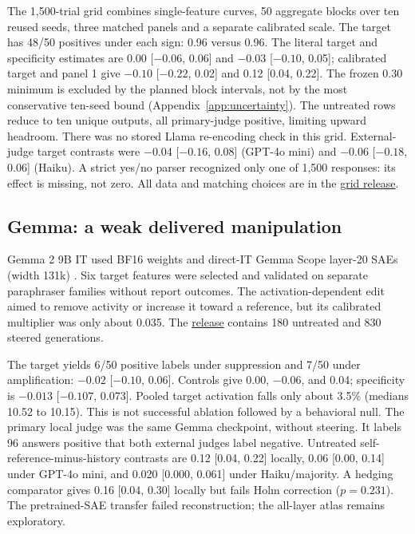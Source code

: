 \documentclass[11pt]{article}
\newcommand{\artifacttree}[2]{\href{https://github.com/tdj28/llm_selfref_pre/tree/f5e906e1737bc71bf20b642af1d698018eec82fe/#1}{#2}}
\begin{document}
The 1,500-trial grid combines single-feature curves, 50 aggregate blocks
over ten reused seeds, three matched panels and a separate calibrated scale.
The target has 48/50 positives under each sign: 0.96 versus 0.96.
The literal target and specificity estimates are 0.00 [$-0.06$, 0.06]
and $-0.03$ [$-0.10$, 0.05]; calibrated target and panel 1 give
$-0.10$ [$-0.22$, 0.02] and 0.12 [0.04, 0.22].
The frozen 0.30 minimum is excluded by the planned block intervals, not
by the most conservative ten-seed bound
(Appendix~\ref{app:uncertainty}). The untreated rows reduce to ten unique
outputs, all primary-judge positive, limiting upward headroom.
There was no stored Llama re-encoding check in this grid.
External-judge target contrasts were $-0.04$ [$-0.16$, 0.08]
(GPT-4o mini) and $-0.06$ [$-0.18$, 0.06] (Haiku).
A strict yes/no parser recognized only one of 1,500 responses: its effect
is missing, not zero. All data and matching choices are in the
\artifacttree{data/public_sae_consciousness_gating/confirmatory_v1_20260710/}{grid release}.

\subsection{Gemma: a weak delivered manipulation}
\label{sec:gemma}
Gemma 2 9B IT used BF16 weights and direct-IT Gemma Scope layer-20
SAEs (width 131k) \citep{lieberum2024gemmascope}.
Six target features were selected and validated on separate paraphraser
families without report outcomes. The activation-dependent edit aimed to
remove activity or increase it toward a reference, but its calibrated
multiplier was only about 0.035. The
\artifacttree{data/gemma_scope_9b/confirmatory_v1_20260711/}{release}
contains 180 untreated and 830 steered generations.

The target yields 6/50 positive labels under suppression and 7/50 under amplification:
$-0.02$ [$-0.10$, 0.06]. Controls give 0.00, $-0.06$, and 0.04;
specificity is $-0.013$ [$-0.107$, 0.073].
Pooled target activation falls only about 3.5\% (medians 10.52 to 10.15).
This is not successful ablation followed by a behavioral null.
The primary local judge was the same Gemma checkpoint, without steering.
It labels 96 answers positive that both external judges
label negative. Untreated self-reference-minus-history contrasts are
0.12 [0.04, 0.22] locally, 0.06 [0.00, 0.14] under GPT-4o mini,
and 0.020 [0.000, 0.061] under Haiku/majority.
A hedging comparator gives 0.16 [0.04, 0.30] locally but fails Holm
correction ($p=0.231$). The pretrained-SAE transfer failed reconstruction;
the all-layer atlas remains exploratory.
\end{document}
